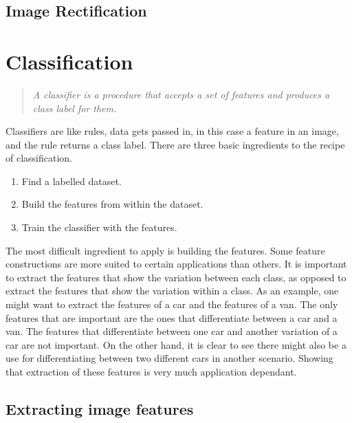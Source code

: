 \documentclass[11pt,oneside]{report}
\begin{document}
				\subsection{Image Rectification}
				
				
			\section{Classification}
				\begin{quote}
					\textit{A classifier is a procedure that accepts a set of features and produces a class label for them.}
					\cite[p. 487]{book:modern}
				\end{quote}
				Classifiers are like rules, data gets passed in, in this case a feature in an image, and the rule returns a class label.
				There are three basic ingredients to the recipe of classification.
				\begin{enumerate}
					\item{Find a labelled dataset.}
					\item{Build the features from within the dataset.}
					\item{Train the classifier with the features.}
				\end{enumerate}
				The most difficult ingredient to apply is building the features.
				Some feature constructions are more suited to certain applications than others.
				It is important to extract the features that show the variation between each class, as opposed to extract the features that show the variation within a class.
				As an example, one might want to extract the features of a car and the features of a van.
				The only features that are important are the ones that differentiate between a car and a van.
				The features that differentiate between one car and another variation of a car are not important.
				On the other hand, it is clear to see there might also be a use for differentiating between two different cars in another scenario.
				Showing that extraction of these features is very much application dependant.
				
				\subsection{Extracting image features}
\end{document}
